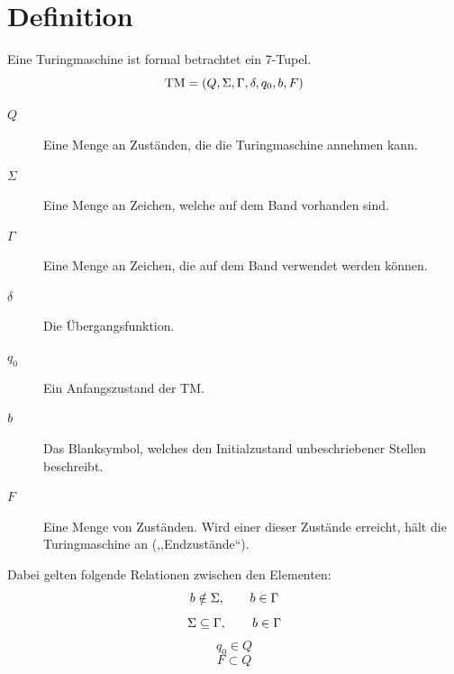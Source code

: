 \section{Definition}
%
Eine Turingmaschine ist formal betrachtet ein 7-Tupel.
\begin{equation}
  \text{TM} = (Q, \Sigma, \Gamma, \delta, q_0, b, F)
\end{equation}
%
\begin{description}
 \item[$Q$] Eine Menge an Zuständen, die die Turingmaschine annehmen kann.
 \item[$\Sigma$] Eine Menge an Zeichen, welche auf dem Band vorhanden sind.
 \item[$\Gamma$] Eine Menge an Zeichen, die auf dem Band verwendet werden können.
 \item[$\delta$] Die Übergangsfunktion.
 \item[$q_0$] Ein Anfangszustand der TM.
 \item[$b$] Das Blanksymbol, welches den Initialzustand unbeschriebener Stellen beschreibt.
 \item[$F$] Eine Menge von Zuständen. Wird einer dieser Zustände erreicht, hält die Turingmaschine an (,,Endzustände``).
\end{description}
%
Dabei gelten folgende Relationen zwischen den Elementen:
\begin{equation}
  b \notin \Sigma,  \hspace{20pt}  b \in \Gamma
\end{equation}
\begin{equation}
  \Sigma \subseteq \Gamma,  \hspace{20pt}  b \in \Gamma
\end{equation}
\begin{equation}
  q_0 \in Q
\end{equation}
\begin{equation}
  F \subset Q
\end{equation}

